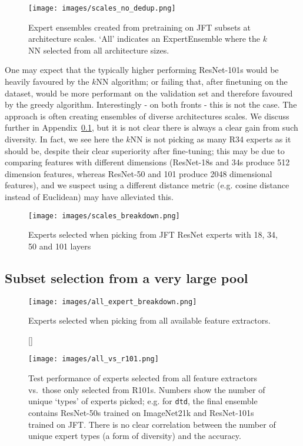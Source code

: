 \documentclass{article} \usepackage{iclr2021_conference,times}
\begin{document}
\begin{figure}[!htb]
    \centering
    \texttt{[image: images/scales\_no\_dedup.png]}
    \caption{Expert ensembles created from pretraining on JFT subsets at architecture scales. `All' indicates an ExpertEnsemble where the $k$NN selected from all architecture sizes.}
    \label{fig:jft_scales}
\end{figure}

One may expect that the typically higher performing ResNet-101s \citep{alex2019big} would be heavily favoured by the $k$NN algorithm; or failing that, after finetuning on the dataset, would be more performant on the validation set and therefore favoured by the greedy algorithm. Interestingly - on both fronts - this is not the case. The approach is often creating ensembles of diverse architectures scales. We discuss further in Appendix~\ref{app:all}, but it is not clear there is always a clear gain from such diversity. In fact, we see here the $k$NN is not picking as many R34 experts as it should be, despite their clear superiority after fine-tuning; this may be due to comparing features with different dimensions (ResNet-18s and 34s produce 512 dimension features, whereas ResNet-50 and 101 produce 2048 dimensional features), and we suspect using a different distance metric (e.g. cosine distance instead of Euclidean) may have alleviated this.

\begin{figure}
    \centering
    \texttt{[image: images/scales\_breakdown.png]}
    \caption{Experts selected when picking from JFT ResNet experts with 18, 34, 50 and 101 layers}
    \label{fig:scales_picked_experts}
\end{figure}






\subsection{Subset selection from a very large pool}
\label{app:all}
\begin{figure}
    \centering
    \texttt{[image: images/all\_expert\_breakdown.png]}
    \caption{Experts selected when picking from all available feature extractors.}
    \label{fig:all_experts_breakdown}
\end{figure}

\begin{figure}
[\FBwidth]
{\caption{Test performance of experts selected from all feature extractors vs.\ those only selected from R101s. Numbers show the number of unique `types' of experts picked; e.g. for \texttt{dtd}, the final ensemble contains ResNet-50s trained on ImageNet21k and ResNet-101s trained on JFT. There is no clear correlation between the number of unique expert types (a form of diversity) and the accuracy.}\label{fig:all_vs_r101}}
{\texttt{[image: images/all\_vs\_r101.png]}}
\end{figure}
\end{document}
